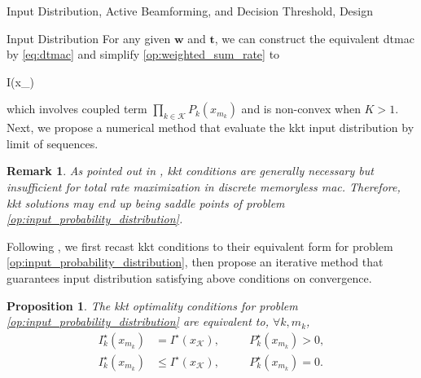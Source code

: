\documentclass[journal]{IEEEtran}
\newtheorem{proposition}{Proposition}
\newtheorem{remark}{Remark}
\begin{document}
\begin{section}{Input Distribution, Active Beamforming, and Decision Threshold, Design}
	\begin{subsection}{Input Distribution}
		For any given $\boldsymbol{w}$ and $\boldsymbol{t}$, we can construct the equivalent \gls{dtmac} by \eqref{eq:dtmac} and simplify \eqref{op:weighted_sum_rate} to
		\begin{maxi!}
			{}{I(x_{})}{\label{op:input_probability_distribution}}{}
			\addConstraint{\eqref{co:sum_probability},\eqref{co:nonnegative_probability},}
		\end{maxi!}
		which involves coupled term $\prod_{k \in \mathcal{K}} P_k(x_{m_k})$ and is non-convex when $K > 1$. Next, we propose a numerical method that evaluate the \gls{kkt} input distribution by limit of sequences.
		\begin{remark}
			As pointed out in \cite{Buhler2011}, \gls{kkt} conditions are generally necessary but insufficient for total rate maximization in discrete memoryless \gls{mac}. Therefore, \gls{kkt} solutions may end up being saddle points of problem \eqref{op:input_probability_distribution}.
		\end{remark}
		Following \cite{Rezaeian2004}, we first recast \gls{kkt} conditions to their equivalent form for problem \eqref{op:input_probability_distribution}, then propose an iterative method that guarantees input distribution satisfying above conditions on convergence.
		\begin{proposition}
			The \gls{kkt} optimality conditions for problem \eqref{op:input_probability_distribution} are equivalent to, $\forall k,m_k$,
			\begin{subequations}
				\label{eq:input_kkt_condition}
				\begin{alignat}{2}
					I_k^\star(x_{m_k}) & = I^\star(x_{\mathcal{K}}), \quad   &  & P_k^\star(x_{m_k}) > 0,\label{eq:probable_states} \\
					I_k^\star(x_{m_k}) & \le I^\star(x_{\mathcal{K}}), \quad &  & P_k^\star(x_{m_k}) = 0.\label{eq:dropped_states}
				\end{alignat}
			\end{subequations}
			\label{pr:input_kkt_condition}
		\end{proposition}


\end{subsection}
\end{section}
\end{document}
